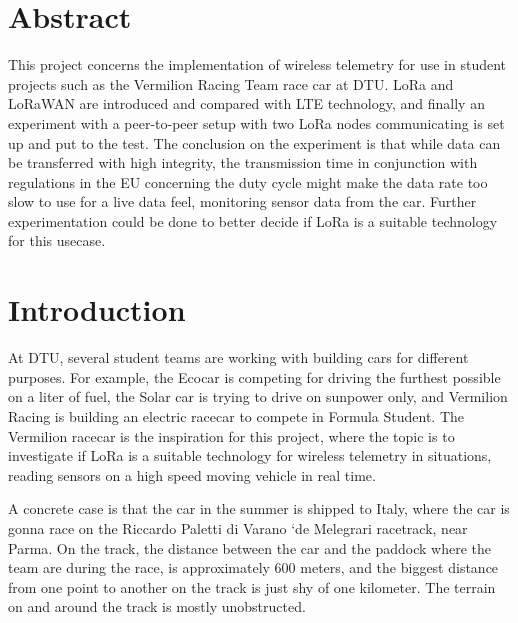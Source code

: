 \section*{Abstract}
This project concerns the implementation of wireless telemetry for use in student projects such as the Vermilion Racing Team race car at DTU. LoRa and LoRaWAN are introduced and compared with LTE technology, and finally an experiment with a peer-to-peer setup with two LoRa nodes communicating is set up and put to the test. The conclusion on the experiment is that while data can be transferred with high integrity, the transmission time in conjunction with regulations in the EU concerning the duty cycle might make the data rate too slow to use for a live data feel, monitoring sensor data from the car. Further experimentation could be done to better decide if LoRa is a suitable technology for this usecase.

\section{Introduction}
At DTU, several student teams are working with building cars for different purposes. For example, the Ecocar is competing for driving the furthest possible on a liter of fuel, the Solar car is trying to drive on sunpower only, and Vermilion Racing is building an electric racecar to compete in Formula Student. The Vermilion racecar is the inspiration for this project, where the topic is to investigate if LoRa is a suitable technology for wireless telemetry in situations, reading sensors on a high speed moving vehicle in real time.

A concrete case is that the car in the summer is shipped to Italy, where the car is gonna race on the Riccardo Paletti di Varano `de Melegrari racetrack, near Parma. On the track, the distance between the car and the paddock where the team are during the race, is approximately 600 meters, and the biggest distance from one point to another on the track is just shy of one kilometer. The terrain on and around the track is mostly unobstructed.
